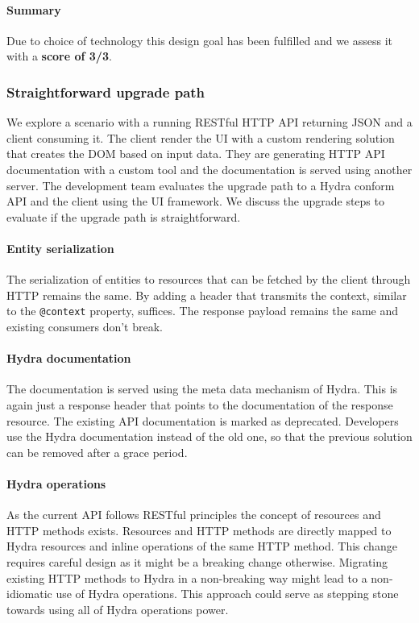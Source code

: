 \paragraph{Summary}
Due to choice of technology this design goal has been fulfilled and we assess it with a \textbf{score of 3/3}.

\subsubsection{Straightforward upgrade path}
We explore a scenario with a running RESTful HTTP API returning JSON and a client consuming it. The client render the UI with a custom rendering solution that creates the DOM based on input data. They are generating HTTP API documentation with a custom tool and the documentation is served using another server. The development team evaluates the upgrade path to a Hydra conform API and the client using the UI framework. We discuss the upgrade steps to evaluate if the upgrade path is straightforward.

\paragraph{Entity serialization}
The serialization of entities to resources that can be fetched by the client through HTTP remains the same. By adding a header that transmits the context, similar to the \lstinline{@context} property, suffices. The response payload remains the same and existing consumers don't break.

\paragraph{Hydra documentation}
The documentation is served using the meta data mechanism of Hydra. This is again just a response header that points to the documentation of the response resource. The existing API documentation is marked as deprecated. Developers use the Hydra documentation instead of the old one, so that the previous solution can be removed after a grace period.

\paragraph{Hydra operations}
As the current API follows RESTful principles the concept of resources and HTTP methods exists. Resources and HTTP methods are directly mapped to Hydra resources and inline operations of the same HTTP method. This change requires careful design as it might be a breaking change otherwise. Migrating existing HTTP methods to Hydra in a non-breaking way might lead to a non-idiomatic use of Hydra operations. This approach could serve as stepping stone towards using all of Hydra operations power.

